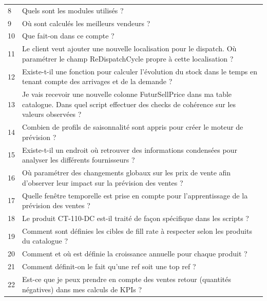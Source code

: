 \begin{longtable}{
    >{\centering\arraybackslash}p{} 
    >{\raggedright\arraybackslash}p{}
}
\rowcolor{gray!15}
\multicolumn{2}{c}{\textbf{Questions plutôt Conceptuelles (Compréhension de la logique métier)}} \\
\midrule
\rowcolor{easyColor} 8  & Quels sont les modules utilisés ? \\
\rowcolor{intermediateColor} 9  & Où sont calculés les meilleurs vendeurs ? \\
\rowcolor{intermediateColor} 10 & Que fait-on dans ce compte ? \\
\rowcolor{intermediateColor} 11 & Le client veut ajouter une nouvelle localisation pour le dispatch. Où paramétrer le champ ReDispatchCycle propre à cette localisation ? \\
\rowcolor{easyColor} 12 & Existe-t-il une fonction pour calculer l'évolution du stock dans le temps en tenant compte des arrivages et de la demande ? \\
\rowcolor{intermediateColor} 13 & Je vais recevoir une nouvelle colonne FuturSellPrice dans ma table catalogue. Dans quel script effectuer des checks de cohérence sur les valeurs observées ? \\
\rowcolor{easyColor} 14 & Combien de profils de saisonnalité sont appris pour créer le moteur de prévision ? \\
\rowcolor{intermediateColor} 15 & Existe-t-il un endroit où retrouver des informations condensées pour analyser les différents fournisseurs ? \\
\rowcolor{intermediateColor} 16 & Où paramétrer des changements globaux sur les prix de vente afin d'observer leur impact sur la prévision des ventes ? \\
\rowcolor{intermediateColor} 17 & Quelle fenêtre temporelle est prise en compte pour l'apprentissage de la prévision des ventes ? \\
\rowcolor{intermediateColor} 18 & Le produit CT-110-DC est-il traité de façon spécifique dans les scripts ? \\
\rowcolor{hardColor} 19 & Comment sont définies les cibles de fill rate à respecter selon les produits du catalogue ? \\
\rowcolor{intermediateColor} 20 & Comment et où est définie la croissance annuelle pour chaque produit ? \\
\rowcolor{intermediateColor} 21 & Comment définit-on le fait qu'une ref soit une top ref ? \\
\rowcolor{hardColor} 22 & Est-ce que je peux prendre en compte des ventes retour (quantités négatives) dans mes calculs de KPIs ? \\

\end{longtable}
